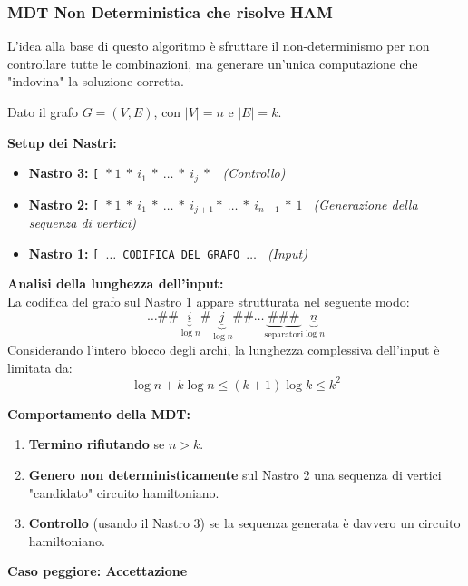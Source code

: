\newpage
\subsubsection*{MDT Non Deterministica che risolve HAM}

L'idea alla base di questo algoritmo è sfruttare il non-determinismo per non controllare tutte le combinazioni, ma generare un'unica computazione che "indovina" la soluzione corretta.

Dato il grafo $G = (V,E)$, con $|V| = n$ e $|E| = k$.

\vspace{0.3cm}
\textbf{Setup dei Nastri:}
\begin{itemize}
    \item \textbf{Nastro 3:} \texttt{[ $\ast \ 1 \ \ast \ i_1 \ \ast \ \dots \ \ast \ i_j \ \ast$ } \quad \textit{(Controllo)}
    \item \textbf{Nastro 2:} \texttt{[ $\ast \ 1 \ \ast \ i_1 \ \ast \ \dots \ \ast \ i_{j+1} \ast \ \dots \  \ast \ i_{n-1} \ \ast \ 1$ } \quad \textit{(Generazione della sequenza di vertici)}
    \item \textbf{Nastro 1:} \texttt{[ $\dots$ CODIFICA DEL GRAFO $\dots$ } \quad \textit{(Input)}
\end{itemize}

\vspace{0.2cm}
\textbf{Analisi della lunghezza dell'input:} \\
La codifica del grafo sul Nastro 1 appare strutturata nel seguente modo:
$$ \dots \# \# \underbrace{\underline{i}}_{\log n} \# \underbrace{\underline{j}}_{\log n} \#\# \dots \underbrace{\#\#\#}_{\text{separatori}} \underbrace{\underline{n}}_{\log n} $$
Considerando l'intero blocco degli archi, la lunghezza complessiva dell'input è limitata da:
$$ \log n + k \log n \le (k+1) \log k \le k^2 $$

\vspace{0.4cm}
\textbf{Comportamento della MDT:}
\begin{enumerate}
    \item \textbf{Termino rifiutando} se $n > k$.
    \item \textbf{Genero non deterministicamente} sul Nastro 2 una sequenza di vertici "candidato" circuito hamiltoniano.
    \item \textbf{Controllo} (usando il Nastro 3) se la sequenza generata è davvero un circuito hamiltoniano.
\end{enumerate}

\vspace{0.4cm}
\textbf{Caso peggiore: Accettazione}

